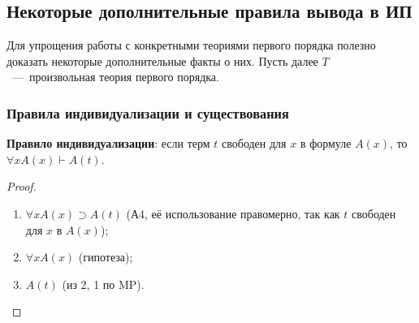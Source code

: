 \subsection{Некоторые дополнительные правила вывода в ИП}
Для упрощения работы с конкретными теориями первого порядка полезно доказать некоторые дополнительные факты о них. Пусть далее $T$~---~произвольная теория первого порядка.

\subsubsection{Правила индивидуализации и существования}
\textbf{Правило индивидуализации}: если терм $t$ свободен для $x$ в формуле $A(x)$, то $\forall xA(x) \vdash A(t)$.
\begin{proof}\leavevmode
    \begin{enumerate}
        \item $\forall xA(x) \supset A(t)$ (А4, её использование правомерно, так как $t$ свободен для $x$ в $A(x)$);
        \item $\forall xA(x)$ (гипотеза);
        \item $A(t)$ (из 2, 1 по MP).
    \end{enumerate}
\end{proof}


